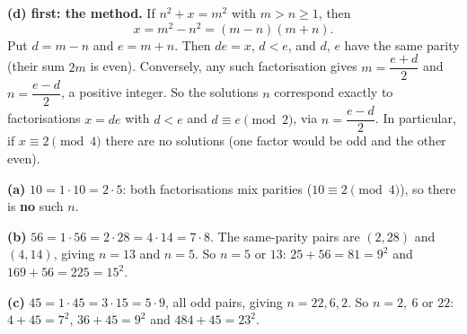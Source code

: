 \textbf{(d) first: the method.} If $n^2+x=m^2$ with $m>n\ge1$, then
\[x=m^2-n^2=(m-n)(m+n).\]
Put $d=m-n$ and $e=m+n$. Then $de=x$, $d<e$, and $d$, $e$ have the same parity (their sum $2m$ is even). Conversely, any such factorisation gives $m=\dfrac{e+d}{2}$ and $n=\dfrac{e-d}{2}$, a positive integer. So the solutions $n$ correspond exactly to factorisations $x=de$ with $d<e$ and $d\equiv e\pmod2$, via $n=\dfrac{e-d}{2}$. In particular, if $x\equiv2\pmod4$ there are no solutions (one factor would be odd and the other even).

\textbf{(a)} $10=1\cdot10=2\cdot5$: both factorisations mix parities ($10\equiv2\pmod4$), so there is \textbf{no} such $n$.

\textbf{(b)} $56=1\cdot56=2\cdot28=4\cdot14=7\cdot8$. The same-parity pairs are $(2,28)$ and $(4,14)$, giving $n=13$ and $n=5$. So $\boxed{n=5\text{ or }13}$: $25+56=81=9^2$ and $169+56=225=15^2$.

\textbf{(c)} $45=1\cdot45=3\cdot15=5\cdot9$, all odd pairs, giving $n=22,6,2$. So $\boxed{n=2,\ 6\text{ or }22}$: $4+45=7^2$, $36+45=9^2$ and $484+45=23^2$.
